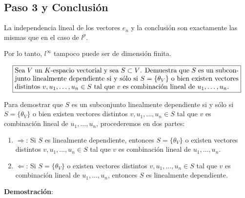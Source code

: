 \documentclass{article}
\begin{document}
\subsection*{Paso 3 y Conclusión}

La independencia lineal de los vectores \( e_n \) y la conclusión son exactamente las mismas que en el caso de \( l^p \).

Por lo tanto, \( l^\infty \) tampoco puede ser de dimensión finita.

\[
\boxed{
\begin{minipage}{0.95\textwidth}
Sea \( V \) un \( K \)-espacio vectorial y sea \( S \subset V \). Demuestra que \( S \) es un subconjunto linealmente dependiente si y sólo si \( S = \{\theta_V\} \) o bien existen vectores distintos \( v, u_1, \ldots, u_n \in S \) tal que \( v \) es combinación lineal de \( u_1, \ldots, u_n \).
\end{minipage}
}
\]


Para demostrar que \( S \) es un subconjunto linealmente dependiente si y sólo si \( S = \{\theta_V\} \) o bien existen vectores distintos \( v, u_1, \ldots, u_n \in S \) tal que \( v \) es combinación lineal de \( u_1, \ldots, u_n \), procederemos en dos partes:

\begin{enumerate}
    \item \( \Rightarrow \): Si \( S \) es linealmente dependiente, entonces \( S = \{\theta_V\} \) o existen vectores distintos \( v, u_1, \ldots, u_n \in S \) tal que \( v \) es combinación lineal de \( u_1, \ldots, u_n \).
    \item \( \Leftarrow \): Si \( S = \{\theta_V\} \) o existen vectores distintos \( v, u_1, \ldots, u_n \in S \) tal que \( v \) es combinación lineal de \( u_1, \ldots, u_n \), entonces \( S \) es linealmente dependiente.
\end{enumerate}

\textbf{Demostración}:
\end{document}
